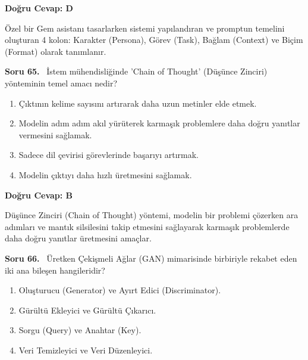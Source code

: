 \documentclass[11pt,a4paper,openany]{book}
\begin{document}
\vspace{4pt}
\begin{tcolorbox}[title=Cevap ve Açıklama, colback=gray!3!white, colframe=primarycolor!90!black, arc=2mm, fonttitle=\bfseries\sffamily, top=6pt, bottom=6pt]
    \textbf{Doğru Cevap: D}

    \vspace{2pt}
    Özel bir Gem asistanı tasarlarken sistemi yapılandıran ve promptun temelini oluşturan 4 kolon: Karakter (Persona), Görev (Task), Bağlam (Context) ve Biçim (Format) olarak tanımlanır.
\end{tcolorbox}
\vspace{10pt}
\needspace{5cm}
\vspace{8pt}
\noindent\textbf{\large\sffamily Soru 65.} \ İstem mühendisliğinde 'Chain of Thought' (Düşünce Zinciri) yönteminin temel amacı nedir?

\begin{enumerate}[label=\Alph*), leftmargin=25pt, topsep=4pt, itemsep=2pt]
        \item Çıktının kelime sayısını artırarak daha uzun metinler elde etmek.
        \item Modelin adım adım akıl yürüterek karmaşık problemlere daha doğru yanıtlar vermesini sağlamak.
        \item Sadece dil çevirisi görevlerinde başarıyı artırmak.
        \item Modelin çıktıyı daha hızlı üretmesini sağlamak.
\end{enumerate}

\vspace{4pt}
\begin{tcolorbox}[title=Cevap ve Açıklama, colback=gray!3!white, colframe=primarycolor!90!black, arc=2mm, fonttitle=\bfseries\sffamily, top=6pt, bottom=6pt]
    \textbf{Doğru Cevap: B}

    \vspace{2pt}
    Düşünce Zinciri (Chain of Thought) yöntemi, modelin bir problemi çözerken ara adımları ve mantık silsilesini takip etmesini sağlayarak karmaşık problemlerde daha doğru yanıtlar üretmesini amaçlar.
\end{tcolorbox}
\vspace{10pt}
\needspace{5cm}
\vspace{8pt}
\noindent\textbf{\large\sffamily Soru 66.} \ Üretken Çekişmeli Ağlar (GAN) mimarisinde birbiriyle rekabet eden iki ana bileşen hangileridir?

\begin{enumerate}[label=\Alph*), leftmargin=25pt, topsep=4pt, itemsep=2pt]
        \item Oluşturucu (Generator) ve Ayırt Edici (Discriminator).
        \item Gürültü Ekleyici ve Gürültü Çıkarıcı.
        \item Sorgu (Query) ve Anahtar (Key).
        \item Veri Temizleyici ve Veri Düzenleyici.
\end{enumerate}
\end{document}
